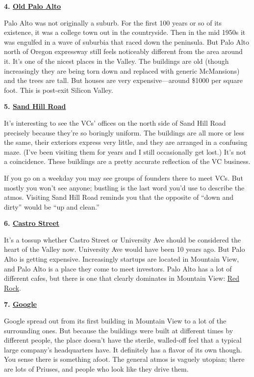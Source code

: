 \textbf{4. \href{http://maps.google.com/maps?q=old+palo+alto}{Old Palo
Alto}}

Palo Alto was not originally a suburb. For the first 100 years or so of
its existence, it was a college town out in the countryside. Then in the
mid 1950s it was engulfed in a wave of suburbia that raced down the
peninsula. But Palo Alto north of Oregon expressway still feels
noticeably different from the area around it. It's one of the nicest
places in the Valley. The buildings are old (though increasingly they
are being torn down and replaced with generic McMansions) and the trees
are tall. But houses are very expensive---around \$1000 per square foot.
This is post-exit Silicon Valley.

\textbf{5.
\href{http://maps.google.com/maps?q=2900+sand+hill+road+menlo+park}{Sand
Hill Road}}

It's interesting to see the VCs' offices on the north side of Sand Hill
Road precisely because they're so boringly uniform. The buildings are
all more or less the same, their exteriors express very little, and they
are arranged in a confusing maze. (I've been visiting them for years and
I still occasionally get lost.) It's not a coincidence. These buildings
are a pretty accurate reflection of the VC business.

If you go on a weekday you may see groups of founders there to meet VCs.
But mostly you won't see anyone; bustling is the last word you'd use to
describe the atmos. Visiting Sand Hill Road reminds you that the
opposite of ``down and dirty'' would be ``up and clean.''

\textbf{6.
\href{http://maps.google.com/maps?q=castro+and+villa+mountain+view}{Castro
Street}}

It's a tossup whether Castro Street or University Ave should be
considered the heart of the Valley now. University Ave would have been
10 years ago. But Palo Alto is getting expensive. Increasingly startups
are located in Mountain View, and Palo Alto is a place they come to meet
investors. Palo Alto has a lot of different cafes, but there is one that
clearly dominates in Mountain View:
\href{http://maps.google.com/places/us/ca/mountain-view/castro-st/201/-red-rock-coffee}{Red
Rock}.

\textbf{7.
\href{http://maps.google.com/maps?q=charleston+road+mountain+view}{Google}}

Google spread out from its first building in Mountain View to a lot of
the surrounding ones. But because the buildings were built at different
times by different people, the place doesn't have the sterile,
walled-off feel that a typical large company's headquarters have. It
definitely has a flavor of its own though. You sense there is something
afoot. The general atmos is vaguely utopian; there are lots of Priuses,
and people who look like they drive them.

